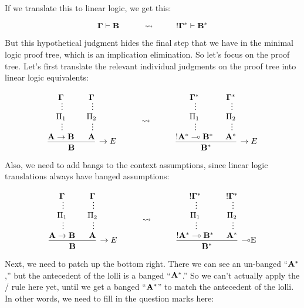 \documentclass[../../../main.tex]{subfiles}
\begin{document}
\noindent
If we translate this to linear logic, we get this:

\begin{equation*}
  \nd{\context/} \ndturnstile/ \nd{B}
  \hskip 1cm \rightsquigarrow \hskip 1cm
  \bang/\nd{\context/}^{*} \ndturnstile/ \nd{B}^{*}
\end{equation*}

\noindent
But this hypothetical judgment hides the final step that we have in the minimal logic proof tree, which is an implication elimination. So let's focus on the proof tree. Let's first translate the relevant individual judgments on the proof tree into linear logic equivalents:

$$
\begin{prooftree}
  \hypo{}
  \infer[no rule]1{\nd{\context/}}
  \ellipsis{}{\Proof/_{1}}
  \ellipsis{}{\nd{A} \impl/ \nd{B}}
  \hypo{}
  \infer[no rule]1{\nd{\context/}}
  \ellipsis{}{\Proof/_{2}}
  \ellipsis{}{\nd{A}}
  \infer2[\implElim/]{\nd{B}}
\end{prooftree}
\hskip 1cm \rightsquigarrow \hskip 1cm
\begin{prooftree}
  \hypo{}
  \infer[no rule]1{\nd{\context/}^{*}}
  \ellipsis{}{\Proof/_{1}}
  \ellipsis{}{\bang/\nd{A}^{*} \lolli/ \nd{B}^{*}}
  \hypo{}
  \infer[no rule]1{\nd{\context/}^{*}}
  \ellipsis{}{\Proof/_{2}}
  \ellipsis{}{\nd{A}^{*}}
  \infer2[\implElim/]{\nd{B}^{*}}
\end{prooftree}
$$

\noindent
Also, we need to add bangs to the context assumptions, since linear logic translations always have banged assumptions:

$$
\begin{prooftree}
  \hypo{}
  \infer[no rule]1{\nd{\context/}}
  \ellipsis{}{\Proof/_{1}}
  \ellipsis{}{\nd{A} \impl/ \nd{B}}
  \hypo{}
  \infer[no rule]1{\nd{\context/}}
  \ellipsis{}{\Proof/_{2}}
  \ellipsis{}{\nd{A}}
  \infer2[\implElim/]{\nd{B}}
\end{prooftree}
\hskip 1cm \rightsquigarrow \hskip 1cm
\begin{prooftree}
  \hypo{}
  \infer[no rule]1{\bang/\nd{\context/}^{*}}
  \ellipsis{}{\Proof/_{1}}
  \ellipsis{}{\bang/\nd{A}^{*} \lolli/ \nd{B}^{*}}
  \hypo{}
  \infer[no rule]1{\bang/\nd{\context/}^{*}}
  \ellipsis{}{\Proof/_{2}}
  \ellipsis{}{\nd{A}^{*}}
  \infer2[\lolliElim/]{\nd{B}^{*}}
\end{prooftree}
$$

\noindent
Next, we need to patch up the bottom right. There we can see an un-banged ``$\mathbf{A}^{*}$,'' but the antecedent of the lolli is a banged ``$\mathbf{A}^{*}$.'' So we can't actually apply the \lolliElim/ rule here yet, until we get a banged ``$\mathbf{A}^{*}$'' to match the antecedent of the lolli. In other words, we need to fill in the question marks here:
\end{document}
